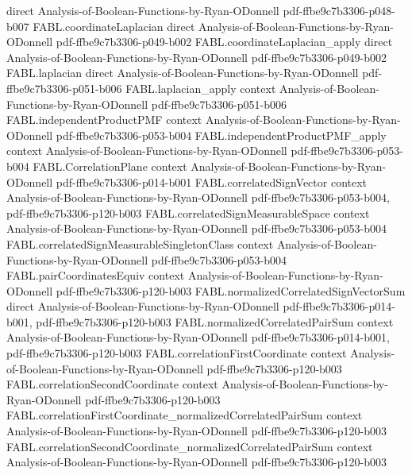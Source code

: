\begin{theorem}
  {direct}
  {Analysis-of-Boolean-Functions-by-Ryan-ODonnell}
  {pdf-ffbe9c7b3306-p048-b007}
\proofstep
  {FABL.coordinateLaplacian}
  {direct}
  {Analysis-of-Boolean-Functions-by-Ryan-ODonnell}
  {pdf-ffbe9c7b3306-p049-b002}
\proofstep
  {FABL.coordinateLaplacian_apply}
  {direct}
  {Analysis-of-Boolean-Functions-by-Ryan-ODonnell}
  {pdf-ffbe9c7b3306-p049-b002}
\proofstep
  {FABL.laplacian}
  {direct}
  {Analysis-of-Boolean-Functions-by-Ryan-ODonnell}
  {pdf-ffbe9c7b3306-p051-b006}
\proofstep
  {FABL.laplacian_apply}
  {context}
  {Analysis-of-Boolean-Functions-by-Ryan-ODonnell}
  {pdf-ffbe9c7b3306-p051-b006}
\proofstep
  {FABL.independentProductPMF}
  {context}
  {Analysis-of-Boolean-Functions-by-Ryan-ODonnell}
  {pdf-ffbe9c7b3306-p053-b004}
\proofstep
  {FABL.independentProductPMF_apply}
  {context}
  {Analysis-of-Boolean-Functions-by-Ryan-ODonnell}
  {pdf-ffbe9c7b3306-p053-b004}
\proofstep
  {FABL.CorrelationPlane}
  {context}
  {Analysis-of-Boolean-Functions-by-Ryan-ODonnell}
  {pdf-ffbe9c7b3306-p014-b001}
\proofstep
  {FABL.correlatedSignVector}
  {context}
  {Analysis-of-Boolean-Functions-by-Ryan-ODonnell}
  {pdf-ffbe9c7b3306-p053-b004,
    pdf-ffbe9c7b3306-p120-b003}
\proofstep
  {FABL.correlatedSignMeasurableSpace}
  {context}
  {Analysis-of-Boolean-Functions-by-Ryan-ODonnell}
  {pdf-ffbe9c7b3306-p053-b004}
\proofstep
  {FABL.correlatedSignMeasurableSingletonClass}
  {context}
  {Analysis-of-Boolean-Functions-by-Ryan-ODonnell}
  {pdf-ffbe9c7b3306-p053-b004}
\proofstep
  {FABL.pairCoordinatesEquiv}
  {context}
  {Analysis-of-Boolean-Functions-by-Ryan-ODonnell}
  {pdf-ffbe9c7b3306-p120-b003}
\proofstep
  {FABL.normalizedCorrelatedSignVectorSum}
  {direct}
  {Analysis-of-Boolean-Functions-by-Ryan-ODonnell}
  {pdf-ffbe9c7b3306-p014-b001,
    pdf-ffbe9c7b3306-p120-b003}
\proofstep
  {FABL.normalizedCorrelatedPairSum}
  {context}
  {Analysis-of-Boolean-Functions-by-Ryan-ODonnell}
  {pdf-ffbe9c7b3306-p014-b001,
    pdf-ffbe9c7b3306-p120-b003}
\proofstep
  {FABL.correlationFirstCoordinate}
  {context}
  {Analysis-of-Boolean-Functions-by-Ryan-ODonnell}
  {pdf-ffbe9c7b3306-p120-b003}
\proofstep
  {FABL.correlationSecondCoordinate}
  {context}
  {Analysis-of-Boolean-Functions-by-Ryan-ODonnell}
  {pdf-ffbe9c7b3306-p120-b003}
\proofstep
  {FABL.correlationFirstCoordinate_normalizedCorrelatedPairSum}
  {context}
  {Analysis-of-Boolean-Functions-by-Ryan-ODonnell}
  {pdf-ffbe9c7b3306-p120-b003}
\proofstep
  {FABL.correlationSecondCoordinate_normalizedCorrelatedPairSum}
  {context}
  {Analysis-of-Boolean-Functions-by-Ryan-ODonnell}
  {pdf-ffbe9c7b3306-p120-b003}

\end{theorem}
